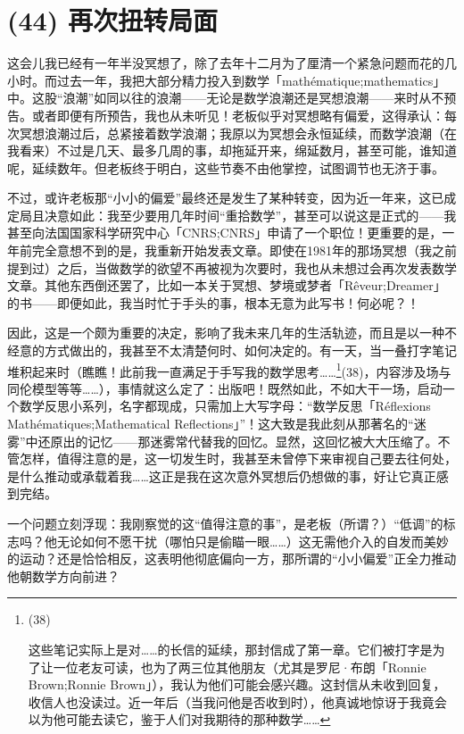 \section{(44) 再次扭转局面}

这会儿我已经有一年半没冥想了，除了去年十二月为了厘清一个紧急问题而花的几小时。而过去一年，我把大部分精力投入到数学「mathématique;mathematics」中。这股“浪潮”如同以往的浪潮——无论是数学浪潮还是冥想浪潮——来时从不预告。或者即便有所预告，我也从未听见！老板似乎对冥想略有偏爱，这得承认：每次冥想浪潮过后，总紧接着数学浪潮；我原以为冥想会永恒延续，而数学浪潮（在我看来）不过是几天、最多几周的事，却拖延开来，绵延数月，甚至可能，谁知道呢，延续数年。但老板终于明白，这些节奏不由他掌控，试图调节也无济于事。

不过，或许老板那“小小的偏爱”最终还是发生了某种转变，因为近一年来，这已成定局且决意如此：我至少要用几年时间“重拾数学”，甚至可以说这是正式的——我甚至向法国国家科学研究中心「CNRS;CNRS」申请了一个职位！更重要的是，一年前完全意想不到的是，我重新开始发表文章。即使在1981年的那场冥想（我之前提到过）之后，当做数学的欲望不再被视为次要时，我也从未想过会再次发表数学文章。其他东西倒还罢了，比如一本关于冥想、梦境或梦者「Rêveur;Dreamer」的书——即便如此，我当时忙于手头的事，根本无意为此写书！何必呢？！

因此，这是一个颇为重要的决定，影响了我未来几年的生活轨迹，而且是以一种不经意的方式做出的，我甚至不太清楚何时、如何决定的。有一天，当一叠打字笔记堆积起来时（瞧瞧！此前我一直满足于手写我的数学思考……\footnote{(38) \par 这些笔记实际上是对……的长信的延续，那封信成了第一章。它们被打字是为了让一位老友可读，也为了两三位其他朋友（尤其是罗尼·布朗「Ronnie Brown;Ronnie Brown」），我认为他们可能会感兴趣。这封信从未收到回复，收信人也没读过。近一年后（当我问他是否收到时），他真诚地惊讶于我竟会以为他可能去读它，鉴于人们对我期待的那种数学……}(38)，内容涉及场与同伦模型等等……），事情就这么定了：出版吧！既然如此，不如大干一场，启动一个数学反思小系列，名字都现成，只需加上大写字母：“数学反思「Réflexions Mathématiques;Mathematical Reflections」”！这大致是我此刻从那著名的“迷雾”中还原出的记忆——那迷雾常代替我的回忆。显然，这回忆被大大压缩了。不管怎样，值得注意的是，这一切发生时，我甚至未曾停下来审视自己要去往何处，是什么推动或承载着我……这正是我在这次意外冥想后仍想做的事，好让它真正感到完结。

一个问题立刻浮现：我刚察觉的这“值得注意的事”，是老板（所谓？）“低调”的标志吗？他无论如何不愿干扰（哪怕只是偷瞄一眼……）这无需他介入的自发而美妙的运动？还是恰恰相反，这表明他彻底偏向一方，那所谓的“小小偏爱”正全力推动他朝数学方向前进？

